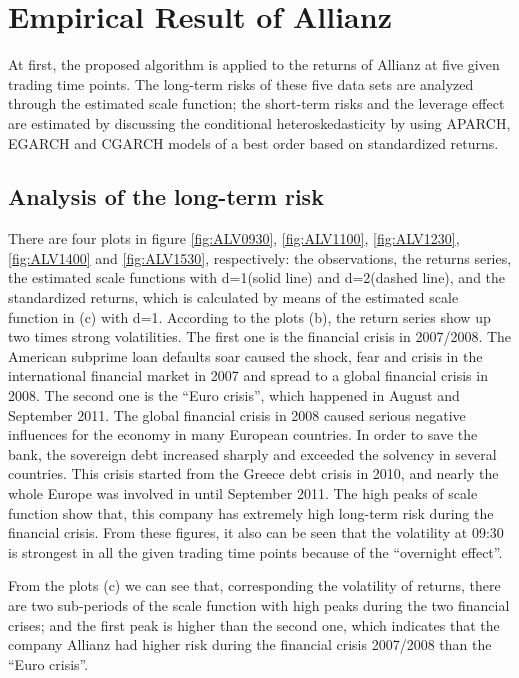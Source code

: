 \section{Empirical Result of Allianz}

At first, the proposed algorithm is applied to the returns of Allianz at five given trading time points. The long-term risks of these five data sets are analyzed through the estimated scale function; the short-term risks and the leverage effect are estimated by discussing the conditional heteroskedasticity by using APARCH, EGARCH and CGARCH models of a best order based on standardized returns. 

\subsection{Analysis of the long-term risk}


There are four plots in figure \ref{fig:ALV0930}, \ref{fig:ALV1100}, \ref{fig:ALV1230}, \ref{fig:ALV1400} and \ref{fig:ALV1530}, respectively: the observations, the returns series, the estimated scale functions with d=1(solid line) and d=2(dashed line), and the standardized returns, which is calculated by means of the estimated scale function in (c) with d=1. 
According to the plots (b), the return series show up two times strong volatilities. The first one is the financial crisis in 2007/2008. The American subprime loan defaults soar caused the shock, fear and crisis in the international financial market in 2007 and spread to a global financial crisis in 2008. The second one is the ``Euro crisis'', which happened in August and September 2011. The global financial crisis in 2008 caused serious negative influences for the economy in many European countries. In order to save the bank, the sovereign debt increased sharply and exceeded the solvency in several countries. This crisis started from the Greece debt crisis in 2010, and nearly the whole Europe was involved in until September 2011. The high peaks of scale function show that, this company has extremely high long-term risk during the financial crisis. From these figures, it also can be seen that the volatility at 09:30 is strongest in all the given trading time points because of the ``overnight effect''. 

From the plots (c) we can see that, corresponding the volatility of returns, there are two sub-periods of the scale function with high peaks during the two financial crises; and the first peak is higher than the second one, which indicates that the company Allianz had higher risk during the financial crisis 2007/2008 than the ``Euro crisis''.

